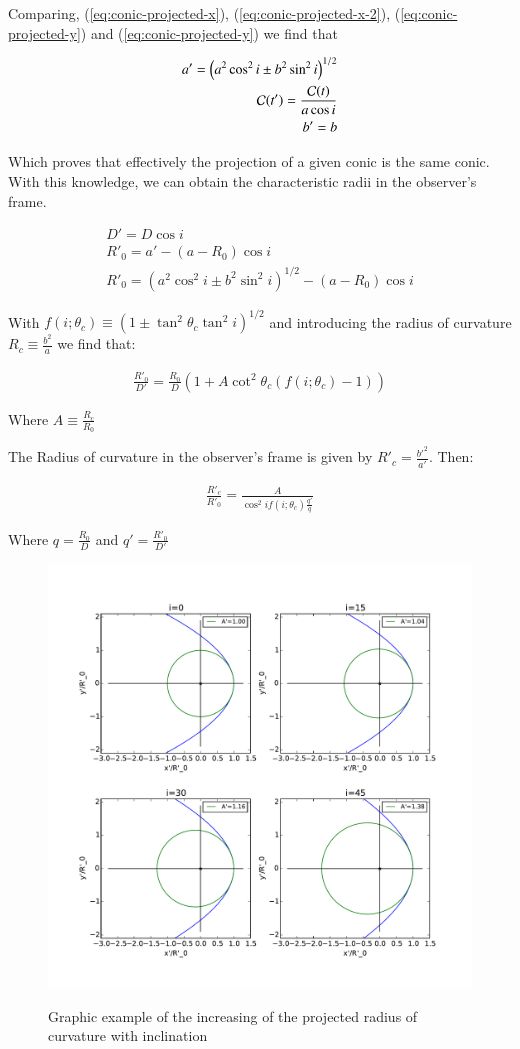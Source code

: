Comparing, (\ref{eq:conic-projected-x}), (\ref{eq:conic-projected-x-2}), (\ref{eq:conic-projected-y}) and (\ref{eq:conic-projected-y}) we find that

\begin{align}
a' = \left(a^2\cos^2 i \pm b^2\sin^2 i\right)^{1/2} \\
\mathcal{C}(t') = \frac{\mathcal{C}(t)}{a\cos i} \\
b' = b
\end{align} 

Which proves that effectively the projection of a given conic is the same conic. With this knowledge, we can obtain the characteristic radii in
the observer's frame.

\begin{align}
D' = D\cos i \\
R'_0 = a' - (a-R_0)\cos i \\
R'_0 = \left(a^2\cos^2 i \pm b^2\sin^2 i\right)^{1/2}  - (a-R_0)\cos i
\end{align}

With  $f(i;\theta_c)\equiv\left(1\pm\tan^2\theta_c\tan^2i\right)^{1/2}$ and introducing the
radius of curvature $R_c\equiv \frac{b^2}{a}$ we find that:

\begin{align}
\frac{R'_0}{D'}=\frac{R_0}{D}\left(1+A\cot^2\theta_c(f(i;\theta_c)-1) \right)
\end{align}

Where $A\equiv \frac{R_c}{R_0}$

The Radius of curvature in the observer's frame is given by $R'_c=\frac{b'^2}{a'}$. Then:

\begin{align}
\frac{R'_c}{R'_0} = \frac{A}{\cos^2 i f(i;\theta_c)\frac{q'}{q}}
\end{align}

Where $q=\frac{R_0}{D}$ and $q' = \frac{R'_0}{D'}$
\begin{figure}
\includegraphics[width=0.8\linewidth]{conic2}
\label{fig:conic2}
\caption{Graphic example of the increasing of the projected radius of curvature with inclination}
\end{figure}

